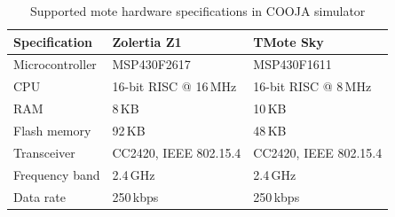 \begin{table}[h]
    \caption{Supported mote hardware specifications in COOJA simulator}
    \label{tab:mote-specs}
    \begin{center}
        \begin{tabular}{lll}
            \hline
            \textbf{Specification} & \textbf{Zolertia Z1} &
            \textbf{TMote Sky} \\
            \hline
            Microcontroller        & MSP430F2617      & MSP430F1611 \\
            CPU                    & 16-bit RISC @ 16\,MHz     &
            16-bit RISC @ 8\,MHz \\
            RAM                    & 8\,KB                     & 10\,KB \\
            Flash memory           & 92\,KB                    & 48\,KB \\
            Transceiver            & CC2420, IEEE 802.15.4     & CC2420,
            IEEE 802.15.4 \\
            Frequency band         & 2.4\,GHz                  & 2.4\,GHz \\
            Data rate              & 250\,kbps                 & 250\,kbps \\
            \hline
        \end{tabular}
    \end{center}
\end{table}
